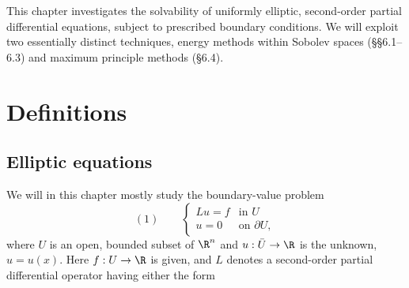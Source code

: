 %


This chapter investigates the solvability of uniformly elliptic, second-order partial differential equations, subject to prescribed boundary conditions. We will exploit two essentially distinct techniques, energy methods within Sobolev spaces (\S\S6.1--6.3) and maximum principle methods (\S6.4).

\section{Definitions}
\label{sec:elliptic-equations-definitions}

\subsection{Elliptic equations}

We will in this chapter mostly study the boundary-value problem
$$(1) \qquad \begin{cases} Lu = f & \text{in } U \\ u = 0 & \text{on } \partial U, \end{cases}$$
where $U$ is an open, bounded subset of $\R^n$ and $u : \bar U \to \R$ is the unknown, $u = u(x)$. Here $f : U \to \R$ is given, and $L$ denotes a second-order partial differential operator having either the form

